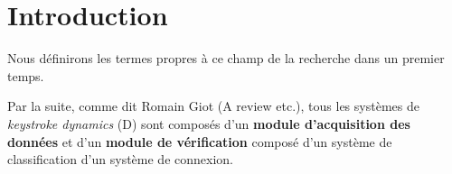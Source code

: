 \section{Introduction}
Nous définirons les termes propres à ce champ de la recherche dans un premier temps.

Par la suite, comme dit Romain Giot (A review etc.), tous les systèmes de \textit{keystroke dynamics} (D) sont composés d'un \textbf{module d'acquisition des données} et d'un \textbf{module de vérification} composé d'un système de classification d'un système de connexion.